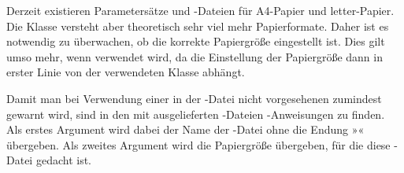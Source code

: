 
Derzeit existieren Parametersätze und -Dateien für A4-Papier und
letter-Papier. Die Klasse  versteht aber theoretisch sehr viel
mehr Papierformate. Daher ist es notwendig zu überwachen, ob die korrekte
Papiergröße eingestellt ist. Dies gilt umso mehr, wenn 
verwendet wird, da die Einstellung der Papiergröße dann in erster Linie von
der verwendeten Klasse abhängt.

\begin{Declaration}
\end{Declaration}
Damit man bei Verwendung einer in der -Datei nicht vorgesehenen
 zumindest gewarnt wird, sind in den
mit \KOMAScript{} ausgelieferten -Dateien
-Anweisungen zu finden. Als erstes Argument
wird dabei der Name der -Datei ohne die Endung »«
übergeben. Als zweites Argument wird die Papiergröße übergeben, für die diese
-Datei gedacht ist.

